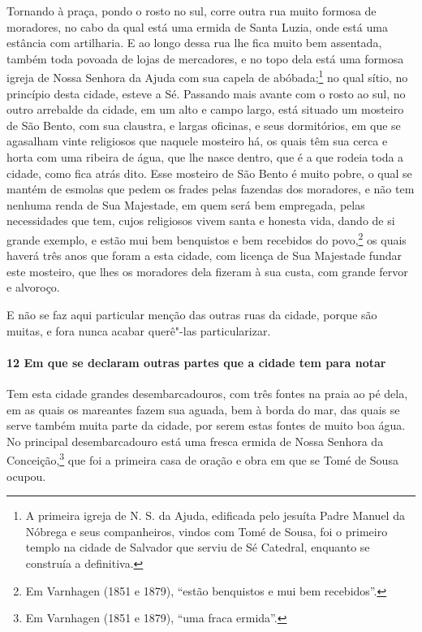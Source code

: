 Tornando à praça, pondo o rosto no sul, corre outra rua muito formosa de moradores, no
cabo da qual está uma ermida de Santa Luzia, onde está uma estância com artilharia. E ao
longo dessa rua lhe fica muito bem assentada, também toda povoada de lojas de mercadores,
e no topo dela está uma formosa igreja de Nossa Senhora da Ajuda com sua capela de
abóbada;\footnote{ A primeira igreja de N. S. da Ajuda, edificada pelo jesuíta Padre
Manuel da Nóbrega e seus companheiros, vindos com Tomé de Sousa, foi o primeiro templo na
cidade de Salvador que serviu de Sé Catedral, enquanto se construía a definitiva.} no qual
sítio, no princípio desta cidade, esteve a Sé. Passando mais avante com o rosto ao sul, no
outro arrebalde da cidade, em um alto e campo largo, está situado um mosteiro de São
Bento, com sua claustra, e largas oficinas, e seus dormitórios, em que se agasalham vinte
religiosos que naquele mosteiro há, os quais têm sua cerca e horta com uma ribeira de
água, que lhe nasce dentro, que é a que rodeia toda a cidade, como fica atrás dito. Esse
mosteiro de São Bento é muito pobre, o qual se mantém de esmolas que pedem os frades pelas
fazendas dos moradores, e não tem nenhuma renda de Sua Majestade, em quem será bem
empregada, pelas necessidades que tem, cujos religiosos vivem santa e honesta vida, dando
de si grande exemplo, e estão mui bem benquistos e bem recebidos do povo,\footnote{ Em
Varnhagen (1851 e 1879), ``estão benquistos e mui bem recebidos''.} os quais haverá três
anos que foram a esta cidade, com licença de Sua Majestade fundar este mosteiro, que lhes
os moradores dela fizeram à sua custa, com grande fervor e alvoroço.

E não se faz aqui particular menção das outras ruas da cidade, porque são muitas, e fora
nunca acabar querê"-las particularizar.

\paragraph{12 Em que se declaram outras partes que a cidade tem para notar}

Tem esta cidade grandes desembarcadouros, com três fontes na praia ao pé dela, em as quais
os mareantes fazem sua aguada, bem à borda do mar, das quais se serve também muita parte
da cidade, por serem estas fontes de muito boa água. No principal desembarcadouro está uma
fresca ermida de Nossa Senhora da Conceição,\footnote{ Em Varnhagen (1851 e 1879), ``uma
fraca ermida''.} que foi a primeira casa de oração e obra em que se Tomé de Sousa ocupou.

